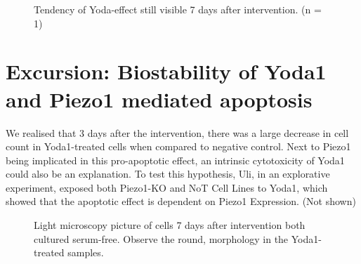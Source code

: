 \begin{figure}
    \centering
    
    \caption{Tendency of Yoda-effect still visible 7 days after intervention. (n = 1)}
    \label{fig:my_label}
\end{figure}

\section{Excursion: Biostability of Yoda1 and Piezo1 mediated apoptosis}
\label{sec:biostability}
We realised that 3 days after the intervention, there was a large decrease in cell count in Yoda1-treated cells when compared to negative control. Next to Piezo1 being implicated in this pro-apoptotic effect, an intrinsic cytotoxicity of Yoda1 could also be an explanation. To test this hypothesis, Uli, in an explorative experiment, exposed both Piezo1-KO and NoT Cell Lines to Yoda1, which showed that the apoptotic effect is dependent on Piezo1 Expression. (Not shown)

\begin{figure}
    \centering
    
    \caption{Light microscopy picture of cells 7 days after intervention both cultured serum-free. Observe the round,  morphology in the Yoda1-treated samples.}
    \label{fig:yoda_apop}
\end{figure}